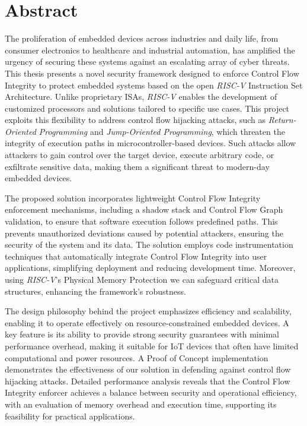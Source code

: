 \chapter*{Abstract}
\label{cha:abstract}

The proliferation of embedded devices across industries and daily life, from consumer
electronics to healthcare and industrial automation, has amplified the urgency
of securing these systems against an escalating array of cyber threats. This thesis
presents a novel security framework designed to enforce Control Flow Integrity to
protect embedded systems based on the open \textit{RISC-V} Instruction Set
Architecture. Unlike proprietary ISAs, \textit{RISC-V} enables the development of
customized processors and solutions tailored to specific use cases. This project
exploits this flexibility to address control flow hijacking attacks, such as \textit{Return-Oriented
Programming} and \textit{Jump-Oriented Programming}, which threaten the
integrity of execution paths in microcontroller-based devices. Such attacks allow
attackers to gain control over the target device, execute arbitrary code, or exfiltrate
sensitive data, making them a significant threat to modern-day embedded devices.

The proposed solution incorporates lightweight Control Flow Integrity
enforcement mechanisms, including a shadow stack and Control Flow Graph validation,
to ensure that software execution follows predefined paths. This prevents unauthorized
deviations caused by potential attackers, ensuring the security of the system
and its data. The solution employs code instrumentation techniques that automatically
integrate Control Flow Integrity into user applications, simplifying deployment
and reducing development time. Moreover, using \textit{RISC-V}'s Physical Memory
Protection we can safeguard critical data structures, enhancing the framework's
robustness.

The design philosophy behind the project emphasizes efficiency and scalability, enabling
it to operate effectively on resource-constrained embedded devices. A key
feature is its ability to provide strong security guarantees with minimal
performance overhead, making it suitable for IoT devices that often have limited
computational and power resources. A Proof of Concept implementation
demonstrates the effectiveness of our solution in defending against control flow
hijacking attacks. Detailed performance analysis reveals that the Control Flow Integrity
enforcer achieves a balance between security and operational efficiency, with an
evaluation of memory overhead and execution time, supporting its feasibility for
practical applications.

